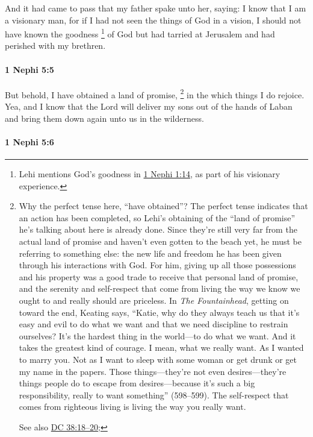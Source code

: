 			And it had came to pass that my father spake unto her, saying:
			I know that I am a visionary man,
			for if I had not seen the things of God in a vision,
			I should not have known the goodness%
				\footnote{%
					Lehi mentions God's goodness in \hyperref[1NEPHI-1-14]{1 Nephi 1:14}, as part of his visionary experience.
					}
			of God
			but had tarried at Jerusalem and had perished with my brethren.

		\paragraph{1 Nephi 5:5} %
			\label{1NEPHI-5-5}

			But behold, I have obtained a land of promise,%
				\footnote{%
					\label{1NEPHI-5-5-NOTE-have}%
					Why the perfect tense here, ``have obtained''? The perfect tense indicates that an action has been completed, so Lehi's obtaining of the ``land of promise'' he's talking about here is already done. Since they're still very far from the actual land of promise and haven't even gotten to the beach yet, he must be referring to something else: the new life and freedom he has been given through his interactions with God. For him, giving up all those possessions and his property was a good trade to receive that personal land of promise, and the serenity and self-respect that come from living the way we know we ought to and really should are priceless. In \textit{The Fountainhead}, getting on toward the end, Keating says, ``Katie, why do they always teach us that it's easy and evil to do what we want and that we need discipline to restrain ourselves? It's the hardest thing in the world---to do what we want. And it takes the greatest kind of courage. I mean, what we really want. As I wanted to marry you. Not as I want to sleep with some woman or get drunk or get my name in the papers. Those things---they're not even desires---they're things people do to escape from desires---because it's such a big responsibility, really to want something'' (598--599). The self-respect that comes from righteous living is living the way you really want.
					
					See also \hyperref[DC38-18]{DC 38:18--20};
					}
			in the which things I do rejoice.
			Yea, and I know that the Lord will deliver my sons out of the hands of Laban
			and bring them down again unto us in the wilderness.

		\paragraph{1 Nephi 5:6} %
			\label{1NEPHI-5-6}

